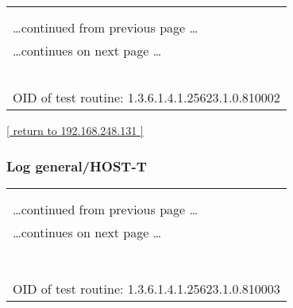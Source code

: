 \documentclass{article}
\begin{document}
\begin{longtable}{|p{}|}
\hline
\rowcolor{openvas_log}{\color{white}{Log (CVSS: 0.0) }}\\
\rowcolor{openvas_log}{\color{white}{NVT: CPE Inventory}}\\
\hline
\endfirsthead
\hfill\ldots continued from previous page \ldots \\
\hline
\endhead
\hline
\ldots continues on next page \ldots \\
\endfoot
\hline
\endlastfoot
\\
\rowcolor{white}{\verb=192.168.248.131|cpe:/o:microsoft:windows=}\\
\rowcolor{white}{\verb==}\\
\rowcolor{white}{\verb==}\\
\\
OID of test routine: 1.3.6.1.4.1.25623.1.0.810002\\
\end{longtable}

\begin{footnotesize}\hyperref[host:192.168.248.131]{[ return to 192.168.248.131 ]}\end{footnotesize}
\subsubsection{Log general/HOST-T}
\label{port:192.168.248.131 general/HOST-T Log}

\begin{longtable}{|p{}|}
\hline
\rowcolor{openvas_log}{\color{white}{Log (CVSS: 0.0) }}\\
\rowcolor{openvas_log}{\color{white}{NVT: Host Summary}}\\
\hline
\endfirsthead
\hfill\ldots continued from previous page \ldots \\
\hline
\endhead
\hline
\ldots continues on next page \ldots \\
\endfoot
\hline
\endlastfoot
\\
\rowcolor{white}{\verb=traceroute:192.168.248.132,192.168.248.131=}\\
\rowcolor{white}{\verb=TCP ports:445,135,139=}\\
\rowcolor{white}{\verb=UDP ports:137=}\\
\rowcolor{white}{\verb==}\\
\rowcolor{white}{\verb==}\\
\\
OID of test routine: 1.3.6.1.4.1.25623.1.0.810003\\
\end{longtable}
\end{document}
